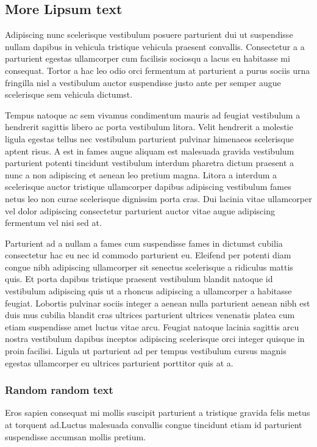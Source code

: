 \subsection{More Lipsum text}
Adipiscing nunc scelerisque vestibulum posuere parturient dui ut suspendisse nullam dapibus in vehicula tristique vehicula praesent convallis. Consectetur a a parturient egestas ullamcorper cum facilisis sociosqu a lacus eu habitasse mi consequat. Tortor a hac leo odio orci fermentum at parturient a purus sociis urna fringilla nisl a vestibulum auctor suspendisse justo ante per semper augue scelerisque sem vehicula dictumst.

Tempus natoque ac sem vivamus condimentum mauris ad feugiat vestibulum a hendrerit sagittis libero ac porta vestibulum litora. Velit hendrerit a molestie ligula egestas tellus nec vestibulum parturient pulvinar himenaeos scelerisque aptent risus. A est in fames augue aliquam est malesuada gravida vestibulum parturient potenti tincidunt vestibulum interdum pharetra dictum praesent a nunc a non adipiscing et aenean leo pretium magna. Litora a interdum a scelerisque auctor tristique ullamcorper dapibus adipiscing vestibulum fames netus leo non curae scelerisque dignissim porta cras. Dui lacinia vitae ullamcorper vel dolor adipiscing consectetur parturient auctor vitae augue adipiscing fermentum vel nisi sed at.

Parturient ad a nullam a fames cum suspendisse fames in dictumst cubilia consectetur hac eu nec id commodo parturient eu. Eleifend per potenti diam congue nibh adipiscing ullamcorper sit senectus scelerisque a ridiculus mattis quis. Et porta dapibus tristique praesent vestibulum blandit natoque id vestibulum adipiscing quis ut a rhoncus adipiscing a ullamcorper a habitasse feugiat. Lobortis pulvinar sociis integer a aenean nulla parturient aenean nibh est duis mus cubilia blandit cras ultrices parturient ultrices venenatis platea cum etiam suspendisse amet luctus vitae arcu. Feugiat natoque lacinia sagittis arcu nostra vestibulum dapibus inceptos adipiscing scelerisque orci integer quisque in proin facilisi. Ligula ut parturient ad per tempus vestibulum cursus magnis egestas ullamcorper eu ultrices parturient porttitor quis at a.

\subsubsection{Random random text}
Eros sapien consequat mi mollis suscipit parturient a tristique gravida felis metus at torquent ad.Luctus malesuada convallis congue tincidunt etiam id parturient suspendisse accumsan mollis pretium.

